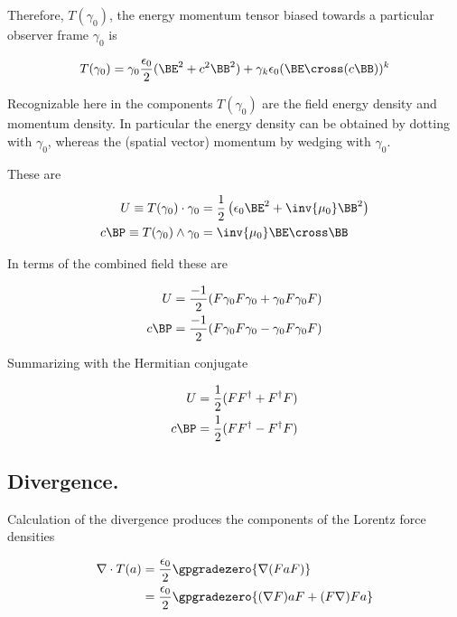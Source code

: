 \documentclass[]{eliblog}
\begin{document}
Therefore, $T(\gamma_0)$, the energy momentum tensor biased towards a particular observer frame $\gamma_0$
is

\begin{align}
T(\gamma_0)
&=
\gamma_0 \frac{\epsilon_0}{2} (\BE^2 + c^2 \BB^2) + \gamma_k \epsilon_0 (\BE \cross (c \BB))^k \\
\end{align}

Recognizable here in the components $T(\gamma_0)$ are the field energy density and momentum density.  In particular
the energy density can be obtained by dotting with $\gamma_0$, whereas the (spatial vector) momentum by wedging with
$\gamma_0$.

These are

\begin{align}
U \equiv T(\gamma_0) \cdot \gamma_0 &= \frac{1}{2} \left( \epsilon_0 \BE^2 + \inv{\mu_0} \BB^2 \right) \\
c \BP \equiv T(\gamma_0) \wedge \gamma_0 &= \inv{\mu_0} \BE \cross \BB
\end{align}

In terms of the combined field these are

\begin{align}
U &= \frac{-1}{2}( F \gamma_0 F \gamma_0 + \gamma_0 F \gamma_0 F) \\
c \BP &= \frac{-1}{2}( F \gamma_0 F \gamma_0 - \gamma_0 F \gamma_0 F)
\end{align}

Summarizing with the Hermitian conjugate

\begin{align}
U &= \frac{1}{2}( F F^\dagger + F^\dagger F) \\
c \BP &= \frac{1}{2}( F F^\dagger - F^\dagger F)
\end{align}

\subsection{ Divergence. }

Calculation of the divergence produces the components of the Lorentz force densities

\begin{align*}
\grad \cdot T(a)
&= \frac{\epsilon_0}{2} \gpgradezero{ \grad (F a F) } \\
&= \frac{\epsilon_0}{2} \gpgradezero{ (\grad F) a F + (F \grad) F a } \\
\end{align*}
\end{document}
